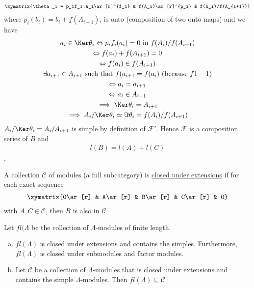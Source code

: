 \begin{align*}
    \xymatrix{\theta_i = p_if_i:A_i\ar[r]^{f_i} & f(A_i)\ar[r]^{p_i} & f(A_i)/f(A_{i+1})}
\end{align*}
where \(p_i(b_i) = b_i + f(A_{i+1})\), is onto (composition of two onto maps) and we have
\begin{gather*}
    a_i\in\Ker \theta_i \Leftrightarrow p_if_i(a_i) = 0 \text{ in } f(A_i)/f(A_{i+1})\\
    \Leftrightarrow f(a_i) + f(A_{i+1}) = 0\\
    \Leftrightarrow f(a_i)\in f(A_{i+1})\\
    \exists a_{i+1}\in A_{i+1}\text{ such that } f(a_{i+1} = f(a_i) \text{   (because } f 1-1)\\
    \Leftrightarrow a_i = a_{i+1}\\
    \Leftrightarrow a_i\in A_{i+1}\\
    \implies \Ker\theta_i = A_{i+1}\\
    \implies A_i/\Ker\theta_i \simeq \Im\theta_i = f(A_i)/f(A_{i+1})
\end{gather*}
\(A_i/\Ker\theta_i = A_i/A_{i+1}\) is simple by definition of \(\mathcal{F}'\). Hence \(\mathcal{F}\) is a composition series of \(B\) and
\begin{align*}
    l(B) = l(A) + l(C)
\end{align*}
\hline
.\\[0.5cm]
\begin{defin}
    A collection \(\mathcal{C}\) of modules (a full subcategory) is \underline{closed under extensions} if for each exact sequence 
    \begin{align*}
        \xymatrix{0\ar[r] & A\ar[r] & B\ar[r] & C\ar[r] & 0}
    \end{align*}
    with \(A, C\in\mathcal{C}\), then \(B\) is also in \(\mathcal{C}\)
\end{defin}
Let \(fl(\Lambda\) be the collection of \(\Lambda\)-modules of finite length.
\begin{prop}
\label{Proposition 13}
\begin{enumerate}[(a)]
    \item \(fl(\Lambda)\) is closed under extensions and contains the simples. Furthermore, \(fl(\Lambda)\) is closed under submodules and factor modules.
    \item Let \(\mathcal{C}\) be a collection of \(\Lambda\)-modules that is closed under extensions and contains the simple \(\Lambda\)-modules. Then \(fl(\Lambda)\subseteq\mathcal{C}\)
\end{enumerate}
\end{prop}
